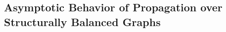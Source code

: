 






\subsection{Asymptotic Behavior of Propagation over Structurally Balanced Graphs}
\label{subsec: sb-2 theory}


